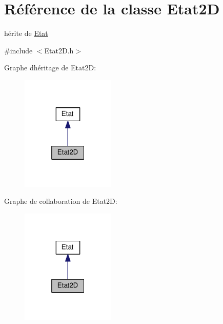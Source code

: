 \hypertarget{class_etat2_d}{}\section{Référence de la classe Etat2D}
\label{class_etat2_d}


hérite de \hyperlink{class_etat}{Etat}  




{\ttfamily \#include $<$Etat2\+D.\+h$>$}



Graphe d\textquotesingle{}héritage de Etat2D\+:\nopagebreak
\begin{figure}[H]
\begin{center}
\leavevmode
\includegraphics[width=127pt]{class_etat2_d__inherit__graph}
\end{center}
\end{figure}


Graphe de collaboration de Etat2D\+:\nopagebreak
\begin{figure}[H]
\begin{center}
\leavevmode
\includegraphics[width=127pt]{class_etat2_d__coll__graph}
\end{center}
\end{figure}

